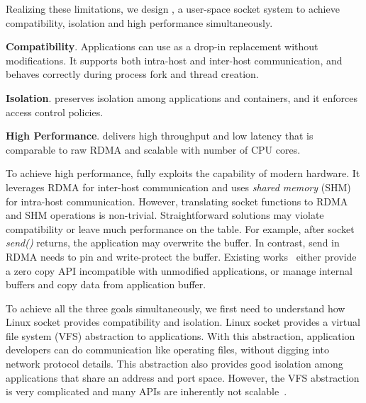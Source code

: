 
Realizing these limitations, we design \sys{}, a user-space socket system to achieve compatibility, isolation and high performance simultaneously.
\begin{ecompact}
	\item \textbf{Compatibility}.
	Applications can use \sys{} as a drop-in replacement without modifications.
	It supports both intra-host and inter-host communication, and behaves correctly during process fork and thread creation.
	\item \textbf{Isolation}.
	\sys{} preserves isolation among applications and containers, and it enforces access control policies.
	\item \textbf{High Performance}.
	\sys{} delivers high throughput and low latency that is comparable to raw RDMA and scalable with number of CPU cores.
\end{ecompact}


To achieve high performance, \sys fully exploits the capability of modern hardware. It leverages RDMA for inter-host communication and uses \emph{shared memory} (SHM) for intra-host communication. However, translating socket functions to RDMA and SHM operations is non-trivial. Straightforward solutions may violate compatibility or leave much performance on the table. For example, after socket \emph{send()} returns, the application may overwrite the buffer. In contrast, send in RDMA needs to pin and write-protect the buffer. Existing works~\cite{rsockets} either provide a zero copy API incompatible with unmodified applications, or manage internal buffers and copy data from application buffer. %

To achieve all the three goals simultaneously, we first need to understand how Linux socket provides compatibility and isolation. Linux socket provides a virtual file system (VFS) abstraction to applications. With this abstraction, application developers can do communication like operating files, without digging into network protocol details. This abstraction also provides good isolation among applications that share an address and port space. However, the VFS abstraction is very complicated and many APIs are inherently not scalable~\cite{clark1989analysis,boyd2010analysis,jeong2014mtcp}.

